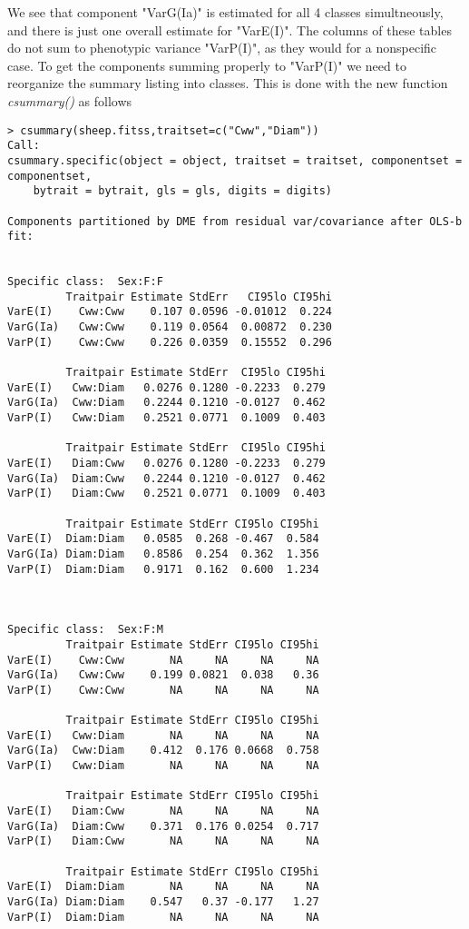 \documentclass[titlepage]{article}  %
\begin{document}
 We see that component "VarG(Ia)" is estimated for all 4 classes simultneously, and there is just one overall estimate for "VarE(I)". The columns of these tables do not sum to phenotypic variance "VarP(I)", as they would for a nonspecific case. To get the components summing properly to "VarP(I)" we need to reorganize the summary listing into classes. This is done with the new function {\em csummary()} as follows
\begin{verbatim}
> csummary(sheep.fitss,traitset=c("Cww","Diam"))
Call:
csummary.specific(object = object, traitset = traitset, componentset = componentset, 
    bytrait = bytrait, gls = gls, digits = digits)

Components partitioned by DME from residual var/covariance after OLS-b fit:


Specific class:  Sex:F:F 
         Traitpair Estimate StdErr   CI95lo CI95hi
VarE(I)    Cww:Cww    0.107 0.0596 -0.01012  0.224
VarG(Ia)   Cww:Cww    0.119 0.0564  0.00872  0.230
VarP(I)    Cww:Cww    0.226 0.0359  0.15552  0.296

         Traitpair Estimate StdErr  CI95lo CI95hi
VarE(I)   Cww:Diam   0.0276 0.1280 -0.2233  0.279
VarG(Ia)  Cww:Diam   0.2244 0.1210 -0.0127  0.462
VarP(I)   Cww:Diam   0.2521 0.0771  0.1009  0.403

         Traitpair Estimate StdErr  CI95lo CI95hi
VarE(I)   Diam:Cww   0.0276 0.1280 -0.2233  0.279
VarG(Ia)  Diam:Cww   0.2244 0.1210 -0.0127  0.462
VarP(I)   Diam:Cww   0.2521 0.0771  0.1009  0.403

         Traitpair Estimate StdErr CI95lo CI95hi
VarE(I)  Diam:Diam   0.0585  0.268 -0.467  0.584
VarG(Ia) Diam:Diam   0.8586  0.254  0.362  1.356
VarP(I)  Diam:Diam   0.9171  0.162  0.600  1.234



Specific class:  Sex:F:M 
         Traitpair Estimate StdErr CI95lo CI95hi
VarE(I)    Cww:Cww       NA     NA     NA     NA
VarG(Ia)   Cww:Cww    0.199 0.0821  0.038   0.36
VarP(I)    Cww:Cww       NA     NA     NA     NA

         Traitpair Estimate StdErr CI95lo CI95hi
VarE(I)   Cww:Diam       NA     NA     NA     NA
VarG(Ia)  Cww:Diam    0.412  0.176 0.0668  0.758
VarP(I)   Cww:Diam       NA     NA     NA     NA

         Traitpair Estimate StdErr CI95lo CI95hi
VarE(I)   Diam:Cww       NA     NA     NA     NA
VarG(Ia)  Diam:Cww    0.371  0.176 0.0254  0.717
VarP(I)   Diam:Cww       NA     NA     NA     NA

         Traitpair Estimate StdErr CI95lo CI95hi
VarE(I)  Diam:Diam       NA     NA     NA     NA
VarG(Ia) Diam:Diam    0.547   0.37 -0.177   1.27
VarP(I)  Diam:Diam       NA     NA     NA     NA




\end{verbatim}
\end{document}
